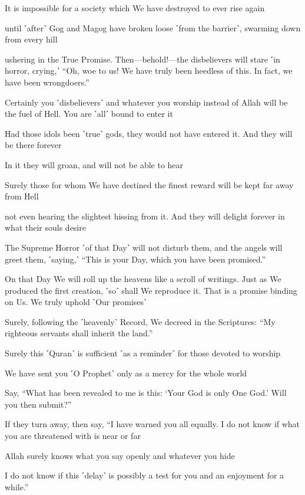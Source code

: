 It is impossible for a society which We have destroyed to ever rise again

until ˹after˺ Gog and Magog have broken loose ˹from the barrier˺, swarming down from every hill

ushering in the True Promise. Then—behold!—the disbelievers will stare ˹in horror, crying,˺ “Oh, woe to us! We have truly been heedless of this. In fact, we have been wrongdoers.”

Certainly you ˹disbelievers˺ and whatever you worship instead of Allah will be the fuel of Hell. You are ˹all˺ bound to enter it

Had those idols been ˹true˺ gods, they would not have entered it. And they will be there forever

In it they will groan, and will not be able to hear

Surely those for whom We have destined the finest reward will be kept far away from Hell

not even hearing the slightest hissing from it. And they will delight forever in what their souls desire

The Supreme Horror ˹of that Day˺ will not disturb them, and the angels will greet them, ˹saying,˺ “This is your Day, which you have been promised.”

On that Day We will roll up the heavens like a scroll of writings. Just as We produced the first creation, ˹so˺ shall We reproduce it. That is a promise binding on Us. We truly uphold ˹Our promises˺

Surely, following the ˹heavenly˺ Record, We decreed in the Scriptures: “My righteous servants shall inherit the land.”

Surely this ˹Quran˺ is sufficient ˹as a reminder˺ for those devoted to worship

We have sent you ˹O Prophet˺ only as a mercy for the whole world

Say, “What has been revealed to me is this: ‘Your God is only One God.’ Will you then submit?”

If they turn away, then say, “I have warned you all equally. I do not know if what you are threatened with is near or far

Allah surely knows what you say openly and whatever you hide

I do not know if this ˹delay˺ is possibly a test for you and an enjoyment for a while.”

